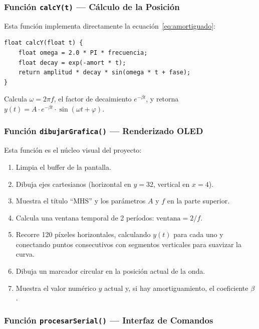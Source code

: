 \documentclass[12pt,a4paper]{article}
\begin{document}
\subsubsection*{Función \texttt{calcY(t)} --- Cálculo de la Posición}

Esta función implementa directamente la ecuación~\ref{eq:amortiguado}:

\begin{verbatim}
float calcY(float t) {
    float omega = 2.0 * PI * frecuencia;
    float decay = exp(-amort * t);
    return amplitud * decay * sin(omega * t + fase);
}
\end{verbatim}

Calcula $\omega = 2\pi f$, el factor de decaimiento $e^{-\beta t}$, y retorna $y(t) = A \cdot e^{-\beta t} \cdot \sin(\omega t + \varphi)$.

\subsubsection*{Función \texttt{dibujarGrafica()} --- Renderizado OLED}

Esta función es el núcleo visual del proyecto:
\begin{enumerate}
    \item Limpia el buffer de la pantalla.
    \item Dibuja ejes cartesianos (horizontal en $y=32$, vertical en $x=4$).
    \item Muestra el título ``MHS'' y los parámetros $A$ y $f$ en la parte superior.
    \item Calcula una ventana temporal de 2 períodos: $\text{ventana} = 2/f$.
    \item Recorre 120 píxeles horizontales, calculando $y(t)$ para cada uno y conectando puntos consecutivos con segmentos verticales para suavizar la curva.
    \item Dibuja un marcador circular en la posición actual de la onda.
    \item Muestra el valor numérico $y$ actual y, si hay amortiguamiento, el coeficiente $\beta$.
\end{enumerate}

\subsubsection*{Función \texttt{procesarSerial()} --- Interfaz de Comandos}
\end{document}
